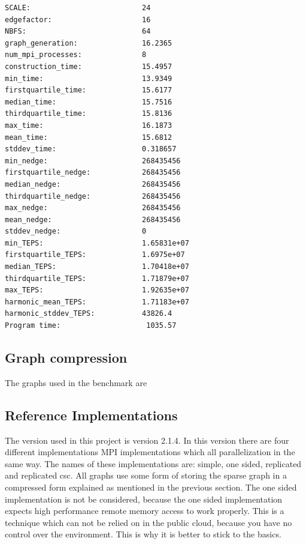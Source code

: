 \begin{lstlisting}
SCALE:                          24
edgefactor:                     16
NBFS:                           64
graph_generation:               16.2365
num_mpi_processes:              8
construction_time:              15.4957
min_time:                       13.9349
firstquartile_time:             15.6177
median_time:                    15.7516
thirdquartile_time:             15.8136
max_time:                       16.1873
mean_time:                      15.6812
stddev_time:                    0.318657
min_nedge:                      268435456
firstquartile_nedge:            268435456
median_nedge:                   268435456
thirdquartile_nedge:            268435456
max_nedge:                      268435456
mean_nedge:                     268435456
stddev_nedge:                   0
min_TEPS:                       1.65831e+07
firstquartile_TEPS:             1.6975e+07
median_TEPS:                    1.70418e+07
thirdquartile_TEPS:             1.71879e+07
max_TEPS:                       1.92635e+07
harmonic_mean_TEPS:             1.71183e+07
harmonic_stddev_TEPS:           43826.4
Program time:                    1035.57
\end{lstlisting}


\subsection{Graph compression}
\label{back:compression}
The graphs used in the benchmark are 


\subsection{Reference Implementations}

The version used in this project is version 2.1.4\cite{graph500-code}. In this version there are four different implementations MPI implementations which all parallelization in the same way. The names of these implementations are: simple, one sided, replicated and replicated csc. All graphs use some form of storing the sparse graph in a compressed form explained as mentioned in the previous section. The one sided implementation is not be considered, because the one sided implementation expects high performance remote memory access to work properly. This is a technique which can not be relied on in the public cloud, because you have no control over the environment. This is why it is better to stick to the basics. 


